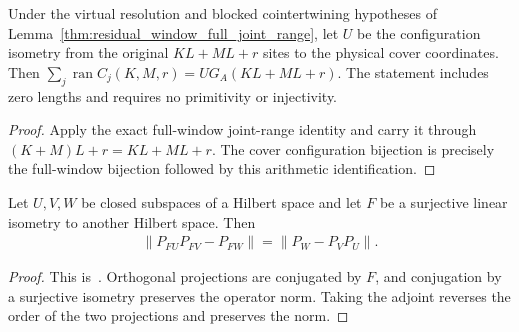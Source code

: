 \begin{lemma}
    \label{thm:residual_window_full_joint_range_cover}
    \leanok
    Under the virtual resolution and blocked cointertwining hypotheses of
    Lemma~\ref{thm:residual_window_full_joint_range}, let $U$ be the
    configuration isometry from the original $KL+ML+r$ sites to the
    physical cover coordinates. Then
    $\sum_j\operatorname{ran}C_j(K,M,r)=U G_A(KL+ML+r)$.
    The statement includes zero lengths and requires no primitivity or injectivity.
\end{lemma}
\begin{proof}\leanok
    Apply the exact full-window joint-range identity and carry it through
    $(K+M)L+r=KL+ML+r$. The cover configuration bijection is precisely the
    full-window bijection followed by this arithmetic identification.
\end{proof}

\begin{lemma}
    \label{thm:isometric_projection_defect_transport}
    \leanok
    Let $U,V,W$ be closed subspaces of a Hilbert space and let $F$ be a
    surjective linear isometry to another Hilbert space. Then
    \begin{align}
        \|P_{FU}P_{FV}-P_{FW}\|=\|P_W-P_VP_U\|.
    \end{align}
\end{lemma}
\begin{proof}\leanok
    This is~\cite[``Isometric conjugation of a projection
        defect'']{QICLean2026Blueprint}.
    Orthogonal projections are conjugated by $F$, and conjugation by a
    surjective isometry preserves the operator norm. Taking the adjoint
    reverses the order of the two projections and preserves the norm.
\end{proof}

